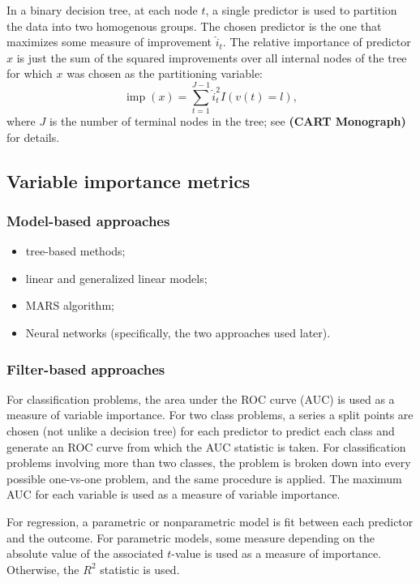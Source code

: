 \documentclass{article}
\def\ref#1{\textbf{(#1)}}
\DeclareMathOperator{\imp}{imp}
\begin{document}
In a binary decision tree, at each node $t$, a single predictor is used to partition the data into two homogenous groups. The chosen predictor is the one that maximizes some measure of improvement $\widehat{i}_t$. The relative importance of predictor $x$ is just the sum of the squared improvements over all internal nodes of the tree for which $x$ was chosen as the partitioning variable:
\begin{equation}
\imp\left(x\right) = \sum_{t = 1}^{J - 1}\widehat{i}_t^2 I\left(v\left(t\right) = l\right),
\end{equation}
where $J$ is the number of terminal nodes in the tree; see \ref{CART Monograph} for details.


\subsection{Variable importance metrics}

\subsubsection{Model-based approaches}
\begin{itemize}
  \item tree-based methods;
  \item linear and generalized linear models;
  \item MARS algorithm;
  \item Neural networks (specifically, the two approaches used later).
\end{itemize}

\subsubsection{Filter-based approaches}


For classification problems, the area under the ROC curve (AUC) is used as a measure of variable importance. For two class problems, a series a split points are chosen (not unlike a decision tree) for each predictor to predict each class and generate an ROC curve from which the AUC statistic is taken. For classification problems involving more than two classes, the problem is broken down into every possible one-vs-one problem, and the same procedure is applied. The maximum AUC for each variable is used as a measure of variable importance.

For regression, a parametric or nonparametric model is fit between each predictor and the outcome. For parametric models, some measure depending on the absolute value of the associated $t$-value is used as a measure of importance. Otherwise, the $R^2$ statistic is used.
\end{document}
